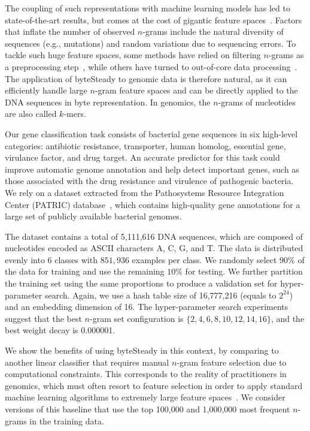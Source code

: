 \documentclass{article}
\begin{document}
The coupling of such representations with machine learning models has led to state-of-the-art results, but comes at the cost of gigantic feature spaces~\cite{drouin2019interpretable,vervier2016large}.
Factors that inflate the number of observed $n$-grams include the natural diversity of sequences (e.g., mutations) and random variations due to sequencing errors.
To tackle such huge feature spaces, some methods have relied on filtering $n$-grams as a preprocessing step~\cite{saeys2007review}, while others have turned to out-of-core data processing~\cite{drouin2016predictive,vervier2016large}.
The application of byteSteady to genomic data is therefore natural, as it can efficiently handle large $n$-gram feature spaces and can be directly applied to the DNA sequences in byte representation. In genomics, the \(n\)-grams of nucleotides are also called \(k\)-mers.

Our gene classification task consists of bacterial gene sequences in six high-level categories: antibiotic resistance, transporter, human homolog, essential gene, virulance factor, and drug target.
An accurate predictor for this task could improve automatic genome annotation and help detect important genes, such as those associated with the drug resistance and virulence of pathogenic bacteria.
We rely on a dataset extracted from the Pathosystems Resource Integration Center (PATRIC) database~\cite{davis2020patric,wattam2014patric}, which contains high-quality gene annotations for a large set of publicly available bacterial genomes.

The dataset contains a total of 5,111,616 DNA sequences, which are composed of nucleotides encoded as ASCII characters A, C, G, and T. The data is distributed evenly into $6$ classes with $851,936$ examples per class. We randomly select $90\%$ of the data for training and use the remaining $10\%$ for testing. We further partition the training set using the same proportions to produce a validation set for hyper-parameter search. Again, we use a hash table size of 16,777,216 (equals to \(2^{24}\)) and an embedding dimension of 16. The hyper-parameter search experiments suggest that the best \(n\)-gram set configuration is \(\{2,4,6,8,10,12,14,16\}\), and the best weight decay is 0.000001.

We show the benefits of using byteSteady in this context, by comparing to another linear classifier that requires manual $n$-gram feature selection due to computational constraints. This corresponds to the reality of practitioners in genomics, which must often resort to feature selection in order to apply standard machine learning algorithms to extremely large feature spaces~\cite{saeys2007review}.
We consider versions of this baseline that use the top 100,000 and 1,000,000 most frequent $n$-grams in the training data.
\end{document}
